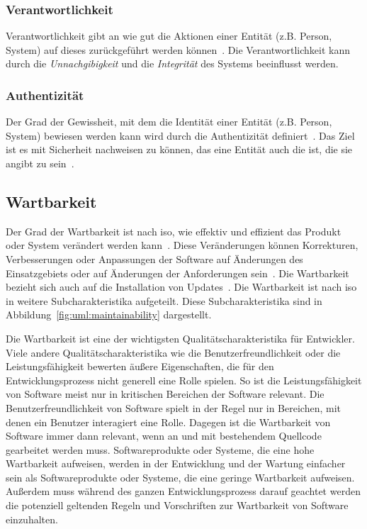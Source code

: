 \documentclass[12pt, a4paper, ngerman]{article}
\begin{document}
\subsubsection{Verantwortlichkeit}

Verantwortlichkeit gibt an wie gut die Aktionen einer Entität (z.B. Person, System) auf dieses zurückgeführt werden können~\cite{ISO25010}.
Die Verantwortlichkeit kann durch die \emph{Unnachgibigkeit} und die \emph{Integrität} des Systems beeinflusst werden. 

\subsubsection{Authentizität}
Der Grad der Gewissheit, mit dem die Identität einer Entität (z.B. Person, System) 
bewiesen werden kann wird durch die Authentizität definiert~\cite{ISO25010}.
Das Ziel ist es mit Sicherheit nachweisen zu können, das eine Entität auch die ist, die sie angibt zu sein~\cite{ISO27000}.

\subsection{Wartbarkeit}
\label{sec:wartbarket}

Der Grad der Wartbarkeit ist nach \ac{iso},
wie effektiv und effizient das Produkt oder System verändert werden kann~\cite{ISO25010}.
Diese Veränderungen können Korrekturen, Verbesserungen
oder Anpassungen der Software auf Änderungen des Einsatzgebiets
oder auf Änderungen der Anforderungen sein~\cite{ISO25010}.
Die Wartbarkeit bezieht sich auch auf die Installation von Updates~\cite{ISO25010}.
Die Wartbarkeit ist nach \ac{iso} in weitere Subcharakteristika aufgeteilt.
Diese Subcharakteristika sind in Abbildung~\ref{fig:uml:maintainability} dargestellt.

Die Wartbarkeit ist eine der wichtigsten Qualitätscharakteristika für Entwickler.
Viele andere Qualitätscharakteristika wie 
die Benutzerfreundlichkeit oder die Leistungsfähigkeit
bewerten äußere Eigenschaften,
die für den Entwicklungsprozess nicht generell eine Rolle spielen.
So ist die Leistungsfähigkeit von Software 
meist nur in kritischen Bereichen der Software relevant.
Die Benutzerfreundlichkeit von Software spielt 
in der Regel nur in Bereichen, mit denen ein Benutzer interagiert eine Rolle.
Dagegen ist die Wartbarkeit von Software
immer dann relevant, 
wenn an und mit bestehendem Quellcode gearbeitet werden muss.
Softwareprodukte oder Systeme,
die eine hohe Wartbarkeit aufweisen,
werden in der Entwicklung und der Wartung einfacher sein
als Softwareprodukte oder Systeme,
die eine geringe Wartbarkeit aufweisen.
Außerdem muss während des ganzen Entwicklungsprozess
darauf geachtet werden die potenziell geltenden 
Regeln und Vorschriften zur Wartbarkeit von Software einzuhalten.
\end{document}
